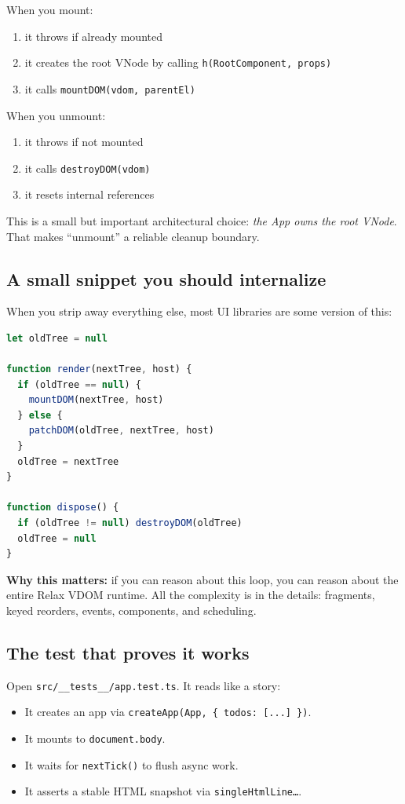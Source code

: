 When you mount:
\begin{enumerate}
  \item it throws if already mounted
  \item it creates the root VNode by calling \texttt{h(RootComponent, props)}
  \item it calls \texttt{mountDOM(vdom, parentEl)}
\end{enumerate}

When you unmount:
\begin{enumerate}
  \item it throws if not mounted
  \item it calls \texttt{destroyDOM(vdom)}
  \item it resets internal references
\end{enumerate}

This is a small but important architectural choice: \emph{the App owns the root VNode}.
That makes ``unmount'' a reliable cleanup boundary.

\subsection{A small snippet you should internalize}
When you strip away everything else, most UI libraries are some version of this:

\begin{lstlisting}[style=relax,language=JavaScript]
let oldTree = null

function render(nextTree, host) {
  if (oldTree == null) {
    mountDOM(nextTree, host)
  } else {
    patchDOM(oldTree, nextTree, host)
  }
  oldTree = nextTree
}

function dispose() {
  if (oldTree != null) destroyDOM(oldTree)
  oldTree = null
}
\end{lstlisting}

	\textbf{Why this matters:}
if you can reason about this loop, you can reason about the entire Relax VDOM runtime.
All the complexity is in the details: fragments, keyed reorders, events, components, and scheduling.

\subsection{The test that proves it works}
Open \texttt{src/\_\_tests\_\_/app.test.ts}.
It reads like a story:

\begin{itemize}
  \item It creates an app via \texttt{createApp(App, \{ todos: [...] \})}.
  \item It mounts to \texttt{document.body}.
  \item It waits for \texttt{nextTick()} to flush async work.
  \item It asserts a stable HTML snapshot via \texttt{singleHtmlLine\ldots}.
\end{itemize}

